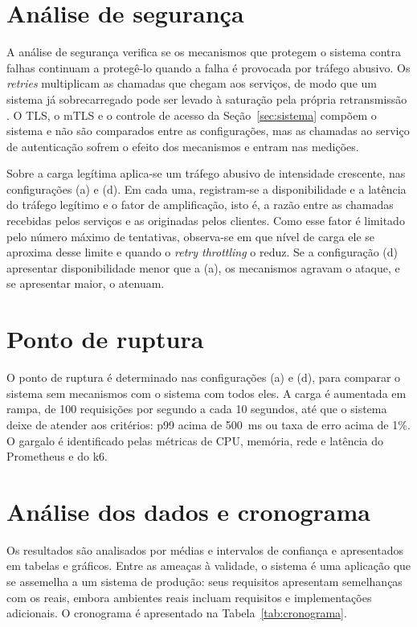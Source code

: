 \section{Análise de segurança}

A análise de segurança verifica se os mecanismos que protegem o sistema contra falhas
continuam a protegê-lo quando a falha é provocada por tráfego abusivo. Os \textit{retries}
multiplicam as chamadas que chegam aos serviços, de modo que um sistema já
sobrecarregado pode ser levado à saturação pela própria retransmissão \cite{Retry-Experiment:2023}.
O TLS, o mTLS e o controle de acesso da Seção~\ref{sec:sistema} compõem o sistema e não são
comparados entre as configurações, mas as chamadas ao serviço de autenticação sofrem o efeito dos
mecanismos e entram nas medições.

Sobre a carga legítima aplica-se um tráfego abusivo de intensidade crescente, nas configurações (a)
e (d). Em cada uma, registram-se a disponibilidade e a latência do tráfego legítimo e o fator de
amplificação, isto é, a razão entre as chamadas recebidas pelos serviços e as originadas pelos
clientes. Como esse fator é limitado pelo número máximo de tentativas, observa-se em que
nível de carga ele se aproxima desse limite e quando o \textit{retry throttling} o reduz. Se a
configuração (d) apresentar disponibilidade menor que a (a), os mecanismos agravam o ataque, e se
apresentar maior, o atenuam.

\section{Ponto de ruptura}

O ponto de ruptura é determinado nas configurações (a) e (d), para comparar o sistema sem mecanismos
com o sistema com todos eles. A carga é aumentada em rampa, de 100 requisições por segundo a cada
10 segundos, até que o sistema deixe de atender aos critérios: p99 acima de 500~ms ou taxa de erro
acima de 1\%. O gargalo é identificado pelas métricas de CPU, memória, rede e latência do Prometheus e do k6.

\section{Análise dos dados e cronograma}

Os resultados são analisados por médias e intervalos de confiança e apresentados em tabelas e
gráficos. Entre as ameaças à validade, o sistema é uma aplicação que se assemelha a um
sistema de produção: seus requisitos apresentam semelhanças com os reais, embora ambientes reais
incluam requisitos e implementações adicionais. O cronograma é apresentado na Tabela~\ref{tab:cronograma}.

